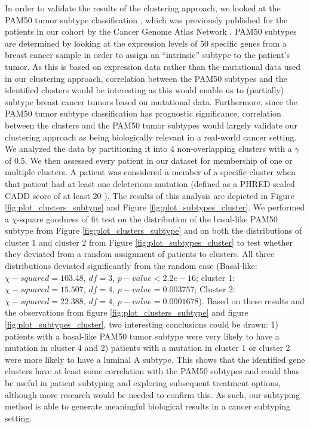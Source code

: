 \documentclass[conference]{IEEEtran}
\begin{document}
In order to validate the results of the clustering approach, we looked at the PAM50 tumor subtype classification \cite{parker2009supervised}, which was previously published for the patients in our cohort by the Cancer Genome Atlas Network \cite{cancer2012comprehensive}. PAM50 subtypes are determined by looking at the expression levels of 50 specific genes from a breast cancer sample in order to assign an “intrinsic” subtype to the patient’s tumor. As this is based on expression data rather than the mutational data used in our clustering approach, correlation between the PAM50 subtypes and the identified clusters would be interesting as this would enable us to (partially) subtype breast cancer tumors based on mutational data. Furthermore, since the PAM50 tumor subtype classification has prognostic significance, correlation between the clusters and the PAM50 tumor subtypes would largely validate our clustering approach as being biologically relevant in a real-world cancer setting.
We analyzed the data by partitioning it into 4 non-overlapping clusters with a $\gamma$ of 0.5. We then assessed every patient in our dataset for membership of one or multiple clusters. A patient was considered a member of a specific cluster when that patient had at least one deleterious mutation (defined as a PHRED-scaled CADD score of at least 20 \cite{kircher2014general}). The results of this analysis are depicted in Figure \ref{fig:plot_clusters_subtype} and Figure \ref{fig:plot_subtypes_cluster}. We performed a $\chi$-square goodness of fit test on the distribution of the basal-like PAM50 subtype from Figure \ref{fig:plot_clusters_subtype} and on both the distributions of cluster 1 and cluster 2 from Figure \ref{fig:plot_subtypes_cluster} to test whether they deviated from a random assignment of patients to clusters. All three distributions deviated significantly from the random case (Basal-like: $\chi-squared = 103.48$, $df = 3$, $p-value < 2.2e-16$; cluster 1: $\chi-squared = 15.507$, $df = 4$, $p-value =0.003757$; Cluster 2: $\chi-squared = 22.388$, $df = 4$, $p-value = 0.0001678$).
Based on these results and the observations from figure \ref{fig:plot_clusters_subtype} and figure \ref{fig:plot_subtypes_cluster}, two interesting conclusions could be drawn: 1) patients with a basal-like PAM50 tumor subtype were very likely to have a mutation in cluster 4 and 2) patients with a mutation in cluster 1 or cluster 2 were more likely to have a luminal A subtype. This shows that the identified gene clusters have at least some correlation with the PAM50 subtypes and could thus be useful in patient subtyping and exploring subsequent treatment options, although more research would be needed to confirm this. As such, our subtyping method is able to generate meaningful biological results in a cancer subtyping setting.
\end{document}
